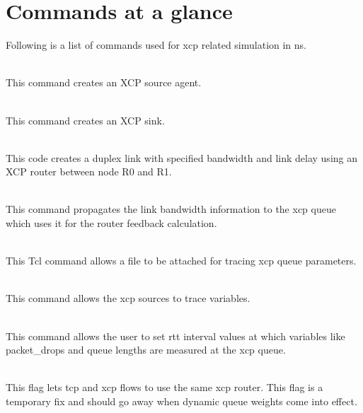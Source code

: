   \section{Commands at a glance}
  \label{sec:commands-xcp}
  
  Following is a list of commands used for xcp related simulation in ns.
  \begin{flushleft}

    \\
    This command creates an XCP source agent.

    \\
    This command creates an XCP sink.

    \\
    This code creates a duplex link with specified bandwidth and link
    delay using an XCP router between node R0 and R1.

    \\
    This command propagates the link bandwidth information to the xcp
    queue which uses it for the router feedback calculation.

    \\
    This Tcl command allows a file to be attached for tracing xcp queue
    parameters. 
    
    \\
    This command allows the xcp sources to trace variables.
    
    \\
    This command allows the user to set rtt interval values at which
    variables like packet\_drops and queue lengths are measured at the
    xcp queue.

    \\
    This flag lets tcp and xcp flows to use the same xcp router. This
    flag is a temporary fix and should go away when dynamic queue
    weights come into effect.
    
  \end{flushleft}
